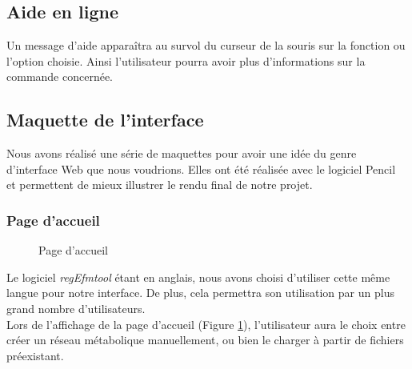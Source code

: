\subsection{Aide en ligne}
Un message d'aide apparaîtra au survol du curseur de la souris sur la fonction ou l'option choisie. Ainsi l'utilisateur pourra avoir plus d'informations sur la commande concernée.

\subsection{Maquette de l'interface}
Nous avons réalisé une série de maquettes pour avoir une idée du genre d'interface Web que nous voudrions. Elles ont été réalisée avec le logiciel Pencil~\cite{pencil:url} et permettent de mieux illustrer le rendu final de notre projet.

\subsubsection{Page d'accueil}

\begin{figure}[!ht]
	\begin{center}
		\caption{Page d'accueil}
  		\label{main}
  	\end{center}	
\end{figure}

Le logiciel \textit{regEfmtool} étant en anglais, nous avons choisi d'utiliser cette même langue pour notre interface. De plus, cela permettra son utilisation par un plus grand nombre d'utilisateurs. \\
			Lors de l'affichage de la page d'accueil (Figure \ref{main}), l'utilisateur aura le choix entre créer un réseau métabolique manuellement, ou bien le charger à partir de fichiers préexistant. 
	
